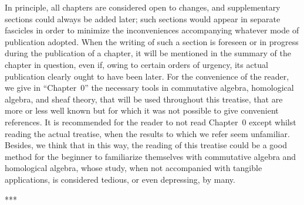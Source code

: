 \documentclass[openany,oneside]{amsbook}
\theoremstyle{ega-env-style}
\theoremstyle{ega-thm-env-style}
\theoremstyle{ega-defn-env-style}
\newcommand{\oldpage}[2][]{{\marginnote{\normalfont{\textbf{#1}~|~#2}}}\ignorespaces}
\def\sectionbreak{\begin{center}***\end{center}}
\begin{document}
\bigskip

In principle, all chapters are considered open to changes, and supplementary sections could always be added later;
such sections would appear in separate fascicles in order to minimize the inconveniences accompanying whatever mode of publication adopted.
When the writing of such a section is foreseen or in progress during the publication of a chapter, it will be mentioned in the summary of the chapter in question, even if, owing to certain orders of urgency, its actual publication clearly ought to have been later.
For the convenience of the reader, we give in ``Chapter~0'' the necessary tools in commutative algebra, homological algebra, and sheaf theory, that will be used throughout this treatise, that are more or less well known but for which it was not possible to give convenient references.
It is recommended for the reader to not read Chapter~0 except whilst reading the actual treatise, when the results to which we refer
\oldpage[I]{7}
seem unfamiliar.
Besides, we think that in this way, the reading of this treatise could be a good method for the beginner to familiarize themselves with commutative algebra and homological algebra, whose study, when not accompanied with tangible applications, is considered tedious, or even depressing, by many.

\sectionbreak
\end{document}
